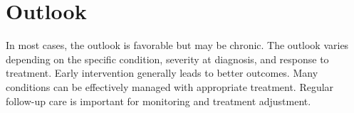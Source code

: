 \section{Outlook}
In most cases, the outlook is favorable but may be chronic. The outlook varies depending on the specific condition, severity at diagnosis, and response to treatment. Early intervention generally leads to better outcomes. Many conditions can be effectively managed with appropriate treatment. Regular follow-up care is important for monitoring and treatment adjustment.
